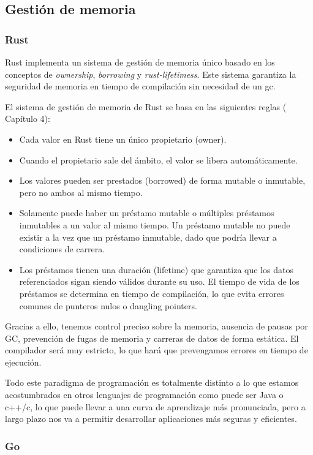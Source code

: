 \subsection{Gestión de memoria}
\subsubsection{Rust}

Rust implementa un sistema de gestión de memoria único basado en los conceptos de \textit{ownership}, \textit{borrowing} y \textit{\glspl{rust-lifetimes}}. Este sistema garantiza la seguridad de memoria en tiempo de compilación sin necesidad de un \acrfull{gc}.

El sistema de gestión de memoria de Rust se basa en las siguientes reglas (\cite{rustbook2024} Capítulo 4):
\begin{itemize}
    \item Cada valor en Rust tiene un único propietario (owner).
    \item Cuando el propietario sale del ámbito, el valor se libera automáticamente.
    \item Los valores pueden ser prestados (borrowed) de forma mutable o inmutable, pero no ambos al mismo tiempo.
    \item Solamente puede haber un préstamo mutable o múltiples préstamos inmutables a un valor al mismo tiempo. Un préstamo mutable no puede existir a la vez que un préstamo inmutable, dado que podría llevar a condiciones de carrera.
    \item Los préstamos tienen una duración (lifetime) que garantiza que los datos referenciados sigan siendo válidos durante su uso. El tiempo de vida de los préstamos se determina en tiempo de compilación, lo que evita errores comunes de punteros nulos o dangling pointers.
\end{itemize}

Gracias a ello, tenemos control preciso sobre la memoria, ausencia de pausas por GC, prevención de fugas de memoria y carreras de datos de forma estática. El compilador será muy estricto, lo que hará que prevengamos errores en tiempo de ejecución.

Todo este paradigma de programación es totalmente distinto a lo que estamos acostumbrados en otros lenguajes de programación como puede ser Java o c++/c, lo que puede llevar a una curva de aprendizaje más pronunciada, pero a largo plazo nos va a permitir desarrollar aplicaciones más seguras y eficientes.

\subsubsection{Go}

